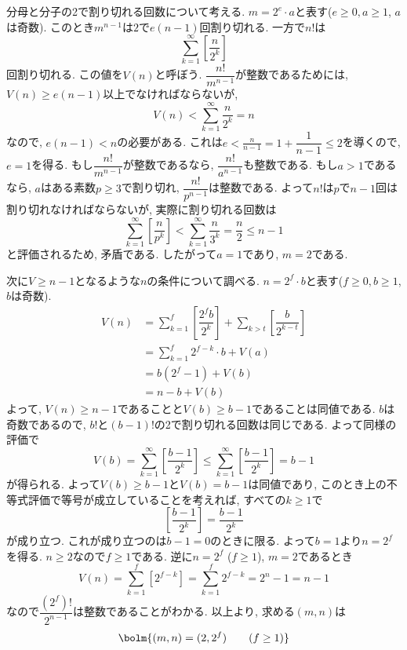 分母と分子の2で割り切れる回数について考える. $m=2^{e}\cdot a$と表す($e\geq 0, a\geq 1$, $a$は奇数). 
このとき$m^{n-1}$は$2$で$e(n-1)$回割り切れる. 一方で$n!$は
\[
\sum_{k=1}^{\infty} \left[ \dfrac{n}{2^k} \right]    
\] 
回割り切れる. この値を$V(n)$と呼ぼう. $\dfrac{n!}{m^{n-1}}$が整数であるためには, $V(n)\geq e(n-1)$以上でなければならないが, 
\[
    V(n) <  \sum_{k=1}^{\infty} \dfrac{n}{2^k} = n    
\]
なので, $e(n-1) < n$の必要がある. これは$e< \frac{n}{n-1} = 1 + \dfrac{1}{n-1} \leq 2$を導くので, $e=1$を得る. 
もし$\dfrac{n!}{m^{n-1}}$が整数であるなら, $\dfrac{n!}{a^{n-1}}$も整数である. もし$a>1$であるなら, $a$はある素数$p\geq 3$で割り切れ, $\dfrac{n!}{p^{n-1}}$は整数である. 
よって$n!$は$p$で$n-1$回は割り切れなければならないが, 実際に割り切れる回数は
\[
\sum_{k=1}^{\infty} \left[ \dfrac{n}{p^k}\right] < \sum_{k=1}^{\infty} \dfrac{n}{3^k} = \dfrac{n}{2} \leq n-1     
\]
と評価されるため, 矛盾である. したがって$a=1$であり, $m = 2$である. \par 
次に$V \geq n-1$となるような$n$の条件について調べる. $n=2^{f}\cdot b$と表す($f\geq 0, b\geq 1$, $b$は奇数). 
\begin{align*}
    V(n) &= \sum_{k=1}^{f} \left[ \dfrac{2^{f}b}{2^{k}} \right] + \sum_{k>t} \left[\dfrac{b}{2^{k-t}}\right] \\ 
      &= \sum_{k=1}^{f} 2^{f-k} \cdot b + V(a) \\ 
      &= b(2^{f} - 1) + V(b) \\ 
      &= n - b + V(b) 
\end{align*}
よって, $V(n) \geq n-1$であることと$V(b) \geq b-1$であることは同値である. $b$は奇数であるので, $b!$と$(b-1)!$の2で割り切れる回数は同じである. よって同様の評価で
\[
V(b) = \sum_{k=1}^{\infty} \left[ \dfrac{b-1}{2^{k}} \right] \leq \sum_{k=1}^{\infty} \left[\dfrac{b-1}{2^k} \right] = b-1   
\]
が得られる. よって$V(b) \geq b-1$と$V(b) = b-1$は同値であり, このとき上の不等式評価で等号が成立していることを考えれば, すべての$k\geq 1$で
\[
\left[\dfrac{b-1}{2^k}\right] = \dfrac{b-1}{2^k}    
\]
が成り立つ. これが成り立つのは$b-1=0$のときに限る. よって$b=1$より$n=2^{f}$を得る. $n\geq 2$なので$f\geq 1$である. 逆に$n=2^{f}$ ($f\geq 1$), $m=2$であるとき
\[V(n) = \sum_{k=1}^{f} [2^{f-k}] = \sum_{k=1}^{f} 2^{f-k} =  2^{n} - 1  = n-1\]
なので$\dfrac{(2^{f})!}{2^{n-1}}$は整数であることがわかる. 以上より, 求める$(m,n)$は
\[
\bolm{(m,n) = (2,2^{f})\qquad (f\geq 1)}
\]